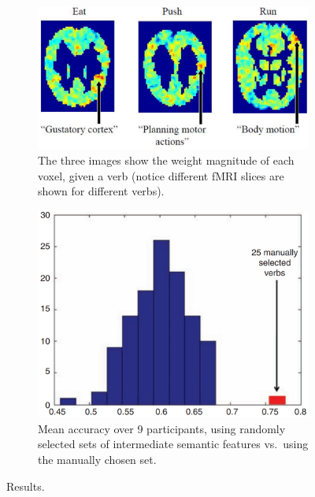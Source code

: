\begin{figure}[!ht]
    \centering
    \captionsetup{width=.8\linewidth}
    \begin{subfigure}{.52\textwidth}
        \centering
        \captionsetup{width=.8\linewidth}
        \includegraphics[width=.9\linewidth]{images/mitchell_4.png}
        \caption{The three images show the weight magnitude of each voxel, given a verb (notice different fMRI slices are shown for different verbs).}
        \label{fig:mitchell_4}
    \end{subfigure}%
    \begin{subfigure}{.47\textwidth}
        \centering
        \captionsetup{width=.8\linewidth}
        \includegraphics[width=.8\linewidth]{images/mitchell_5.png}
        \caption{Mean accuracy over 9 participants, using  randomly selected sets of intermediate semantic features vs.~using the manually chosen set.}
        \label{fig:mitchell_5}
    \end{subfigure}
    \caption{Results.}
    \label{fig:mitchell_45}
\end{figure}


